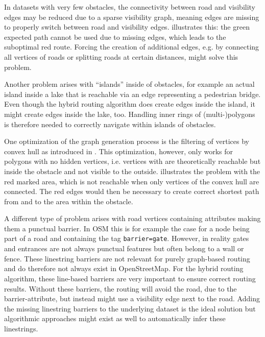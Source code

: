 		In datasets with very few obstacles, the connectivity between road and visibility edges may be reduced due to a sparse visibility graph, meaning edges are missing to properly switch between road and visibility edges.
		 illustrates this:
		the green expected path cannot be used due to missing edges, which leads to the suboptimal red route.
		Forcing the creation of additional edges, e.g. by connecting all vertices of roads or splitting roads at certain distances, might solve this problem.
		
		Another problem arises with \enquote{islands} inside of obstacles, for example an actual island inside a lake that is reachable via an edge representing a pedestrian bridge.
		Even though the hybrid routing algorithm does create edges inside the island, it might create edges inside the lake, too.
		Handling inner rings of (multi-)polygons is therefore needed to correctly navigate within islands of obstacles.
		
		One optimization of the graph generation process is the filtering of vertices by convex hull as introduced in .
		This optimization, however, only works for polygons with no hidden vertices, i.e. vertices with are theoretically reachable but inside the obstacle and not visible to the outside.
		 illustrates the problem with the red marked area, which is not reachable when only vertices of the convex hull are connected.
		The red edges would then be necessary to create correct shortest path from and to the area within the obstacle.
		
		A different type of problem arises with road vertices containing attributes making them a punctual barrier.
		In OSM this is for example the case for a node being part of a road and containing the tag \texttt{barrier=gate}.
		However, in reality gates and entrances are not always punctual features but often belong to a wall or fence.
		These linestring barriers are not relevant for purely graph-based routing and do therefore not always exist in OpenStreetMap.
		For the hybrid routing algorithm, these line-based barriers are very important to ensure correct routing results.
		Without these barriers, the routing will avoid the road, due to the barrier-attribute, but instead might use a visibility edge next to the road.
		Adding the missing linestring barriers to the underlying dataset is the ideal solution but algorithmic approaches might exist as well to automatically infer these linestrings.
		
